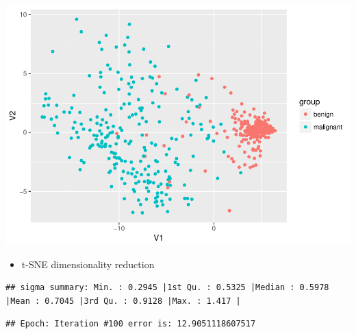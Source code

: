 \documentclass[]{article}
\newenvironment{Shaded}{\begin{snugshade}}{\end{snugshade}}
\newcommand{\KeywordTok}[1]{\textcolor[rgb]{0.13,0.29,0.53}{\textbf{{#1}}}}
\newcommand{\DataTypeTok}[1]{\textcolor[rgb]{0.13,0.29,0.53}{{#1}}}
\newcommand{\DecValTok}[1]{\textcolor[rgb]{0.00,0.00,0.81}{{#1}}}
\newcommand{\StringTok}[1]{\textcolor[rgb]{0.31,0.60,0.02}{{#1}}}
\newcommand{\NormalTok}[1]{{#1}}
\providecommand{\tightlist}{%
  \setlength{\itemsep}{0pt}\setlength{\parskip}{0pt}}
\begin{document}
\includegraphics{webinar_code_files/figure-latex/mds_plot-1.pdf}

\begin{itemize}
\tightlist
\item
  t-SNE dimensionality reduction
\end{itemize}

\begin{Shaded}
\end{Shaded}

\begin{verbatim}
## sigma summary: Min. : 0.2945 |1st Qu. : 0.5325 |Median : 0.5978 |Mean : 0.7045 |3rd Qu. : 0.9128 |Max. : 1.417 |
\end{verbatim}

\begin{verbatim}
## Epoch: Iteration #100 error is: 12.9051118607517
\end{verbatim}
\end{document}
